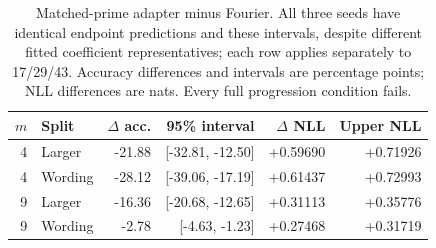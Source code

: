 \begin{table}[htbp]
\centering\small
\caption{Matched-prime adapter minus Fourier. All three seeds have identical
endpoint predictions and these intervals, despite different fitted coefficient
representatives; each row applies separately to 17/29/43. Accuracy differences
and intervals are percentage points; NLL differences are nats. Every full
progression condition fails.}
\label{tab:modular-paired}
\begin{tabular}{rlrrrr}
\toprule
$m$ & Split & $\Delta$ acc. & 95\% interval & $\Delta$ NLL & Upper NLL\\
\midrule
4 & Larger & -21.88 & [-32.81, -12.50] & +0.59690 & +0.71926\\
4 & Wording & -28.12 & [-39.06, -17.19] & +0.61437 & +0.72993\\
9 & Larger & -16.36 & [-20.68, -12.65] & +0.31113 & +0.35776\\
9 & Wording & -2.78 & [-4.63, -1.23] & +0.27468 & +0.31719\\
\bottomrule
\end{tabular}
\end{table}
